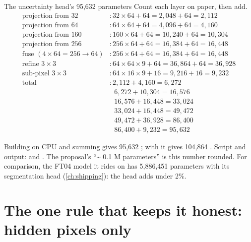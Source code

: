 \begin{worked}[label={we:uncertainty:count}]{The uncertainty head's 95,632 parameters}
Count each layer on paper, then add.
\begin{align*}
\text{projection from }32 &: 32\times 64 + 64 = 2{,}048+64 = 2{,}112\\
\text{projection from }64 &: 64\times 64 + 64 = 4{,}096+64 = 4{,}160\\
\text{projection from }160 &: 160\times 64 + 64 = 10{,}240+64 = 10{,}304\\
\text{projection from }256 &: 256\times 64 + 64 = 16{,}384+64 = 16{,}448\\
\text{fuse }(4\times 64=256\to 64) &: 256\times 64 + 64 = 16{,}384+64 = 16{,}448\\
\text{refine }3\times3 &: 64\times 64\times 9 + 64 = 36{,}864 + 64 = 36{,}928\\
\text{sub-pixel }3\times3 &: 64\times 16\times 9 + 16 = 9{,}216 + 16 = 9{,}232\\[3pt]
\text{total} &: 2{,}112+4{,}160 = 6{,}272\\
 &\phantom{:}\ 6{,}272+10{,}304 = 16{,}576\\
 &\phantom{:}\ 16{,}576+16{,}448 = 33{,}024\\
 &\phantom{:}\ 33{,}024+16{,}448 = 49{,}472\\
 &\phantom{:}\ 49{,}472+36{,}928 = 86{,}400\\
 &\phantom{:}\ 86{,}400+9{,}232 = 95{,}632
\end{align*}
\end{worked}

\begin{sourcenote}
Building  on CPU and summing
 gives 95,632 \tagC; with  it gives 104,864 \tagC. Script and output:
 and . The proposal's ``\textasciitilde
0.1 M parameters''  is this number rounded. For comparison, the
FT04 model it rides on has 5,886,451 parameters with its segmentation head (\cref{ch:shipping}): the head adds
under 2\%.
\end{sourcenote}

\section{The one rule that keeps it honest: hidden pixels only}\label{sec:uncertainty:rule}

